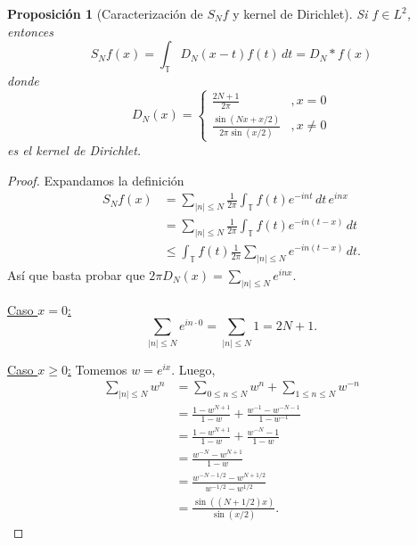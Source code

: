 \documentclass{article}
\newtheorem{Proposicion}{Proposición}
\theoremstyle{plain}
\theoremstyle{definition}
\newcommand{\T}{\mathbb{T}}
\newcommand{\abs}[1]{\lvert #1 \rvert}
\begin{document}
\begin{Proposicion}[Caracterización de \(S_N f\) y kernel de Dirichlet]
  Si \(f\in L^2\), entonces 
  \begin{displaymath}
    S_N f(x) = \int_{\T} D_N(x-t) f(t) \, dt = D_N\ast f(x)
  \end{displaymath}
  donde 
  \begin{displaymath}
    D_N(x) = \begin{cases}
      \frac{2N+1}{2\pi} &, x=0 \\
      \frac{ \sin\left( Nx + x/2 \right)}{ 2\pi \sin(x/2)} &, x\ne 0
    \end{cases}
  \end{displaymath}
  es el kernel de Dirichlet. 
\end{Proposicion}
\begin{proof}
  Expandamos la definición
  \begin{align*}
    S_N f(x)
    &=
    \sum_{\abs{n} \le N}
      \frac{1}{2\pi}
      \int_{\T} f(t) e^{-int} \, dt
      \, e^{inx}
    \\&=
    \sum_{\abs{n} \le N}
      \frac{1}{2\pi}
      \int_{\T} f(t) e^{-in(t-x)} \, dt
    \\&\le
    \int_{\T} 
      f(t) 
      \frac{1}{2\pi}
      \sum_{\abs{n} \le N}
      e^{-in(t-x)}
    \, dt.
  \end{align*}
  Así que basta probar que \(2\pi D_N(x) = \sum_{\abs{n}\le N} e^{inx}\).

  \underline{Caso \(x=0\):}
  \begin{displaymath}
    \sum_{\abs{n} \le N} e^{in\cdot 0}
    = \sum_{\abs{n} \le N} 1
    = 2N+1.
  \end{displaymath}

  \underline{Caso \(x\ge 0\):} Tomemos \(w = e^{ix}\). Luego,
  \begin{align*}
    \sum_{\abs{n} \le N} w^n
    &=
    \sum_{0 \le n \le N} w^n
    +
    \sum_{1 \le n \le N} w^{-n}
    \\&=
    \frac{1-w^{N+1}}{1-w}
    +
    \frac{w^{-1} - w^{-N-1}}{1-w^{-1}}
    \\&=
    \frac{1-w^{N+1}}{1-w}
    +
    \frac{w^{-N}-1}{1-w}
    \\&=
    \frac{w^{-N} - w^{N+1}}{1-w}
    \\&=
    \frac{w^{-N-1/2} - w^{N+1/2}}{w^{-1/2} - w^{1/2}}
    \\&=
    \frac{ \sin\left( (N+1/2)x \right) }{ \sin\left( x/2 \right)}.
  \end{align*}
\end{proof}
\end{document}
